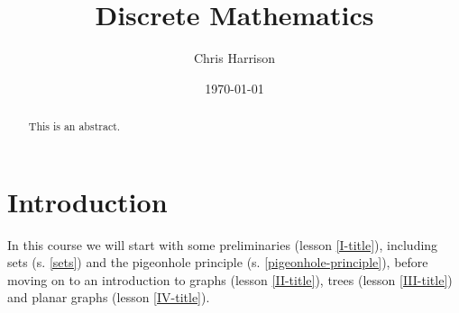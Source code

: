 \documentclass[11pt,a4paper]{article}
\title{Discrete Mathematics}
\author{Chris Harrison}
\date{\today}
\begin{document}
\maketitle 

\begin{abstract}
This is an abstract. 
\end{abstract}

\section*{Introduction}

In this course we will start with some preliminaries (lesson \ref{I-title}), 
including sets (s. \ref{sets}) and the pigeonhole 
principle (s. \ref{pigeonhole-principle}), 
before moving on to an introduction to graphs (lesson \ref{II-title}), 
trees (lesson \ref{III-title}) and planar graphs (lesson \ref{IV-title}).









\end{document}
